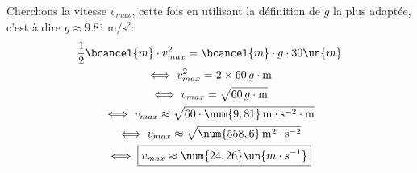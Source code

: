 Cherchons la vitesse $v_{max}$,  cette fois en utilisant la définition de $g$ la plus adaptée, c'est à dire $g \approx \SI{9.81}{\meter\per\second\squared}$:
\begin{gather*}
    \frac{1}{2}\bcancel{m}\cdot v_{max}^2 = \bcancel{m}\cdot g \cdot 30 \un{m} \\
    \iff v_{max}^2=2\times60\,g\cdot \mathrm{m} \\
    \iff v_{max}=\sqrt{60\,g\cdot \mathrm{m}} \\
    \iff v_{max} \approx \sqrt{60\cdot\num{9,81} \,\mathrm{m \cdot s^{-2}}\cdot \mathrm{m}} \\
    \iff v_{max} \approx \sqrt{\num{558,6} \,\mathrm{m^2 \cdot s^{-2}}} \\
    \iff \boxed{v_{max} \approx \num{24,26} \un{m \cdot s^{-1}}}
\end{gather*}